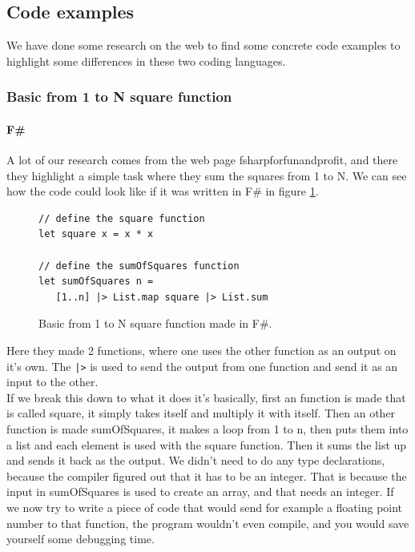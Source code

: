 \documentclass[12pt, a4paper]{article}
\newcommand{\code}[1]{{\small \texttt{#1}}}
\begin{document}
\newpage
\subsection{Code examples}
We have done some research on the web to find some concrete code examples to highlight some differences in these two coding languages.

\subsubsection{Basic from 1 to N square function}
\paragraph{F\#}
A lot of our research comes from the web page fsharpforfunandprofit, and there they highlight a simple task where they sum the squares from 1 to N. We can see how the code could look like if it was written in F\# in figure \ref{fig:SquareFunctionFSharp}.

\begin{figure}[!h]
\begin{lstlisting}
// define the square function
let square x = x * x

// define the sumOfSquares function
let sumOfSquares n = 
   [1..n] |> List.map square |> List.sum
\end{lstlisting}
\caption{Basic from 1 to N square function made in F\#.}
\label{fig:SquareFunctionFSharp}
\end{figure}

Here they made 2 functions, where one uses the other function as an output on it’s own. The \code{|>} is used to send the output from one function and send it as an input to the other.\\

If we break this down to what it does it’s basically, first an function is made that is called square, it simply takes itself and multiply it with itself. Then an other function is made sumOfSquares, it makes a loop from 1 to n, then puts them into a list and each element is used with the square function. Then it sums the list up and sends it back as the output. We didn’t need to do any type declarations, because the compiler figured out that it has to be an integer. That is because the input in sumOfSquares is used to create an array, and that needs an integer. If we now try to write a piece of code that would send for example a floating point number to that function, the program wouldn’t even compile, and you would save yourself some debugging time.\\
\end{document}

